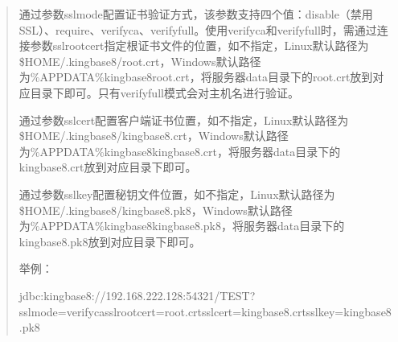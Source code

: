 \documentclass[letterpaper,10pt,english]{sphinxmanual}
\begin{document}
\begin{quote}

通过参数sslmode配置证书验证方式，该参数支持四个值：disable（禁用SSL）、require、verify\sphinxhyphen{}ca、verify\sphinxhyphen{}full。使用verify\sphinxhyphen{}ca和verify\sphinxhyphen{}full时，需通过连接参数sslrootcert指定根证书文件的位置，如不指定，Linux默认路径为\$HOME/.kingbase8/root.crt，Windows默认路径为\%APPDATA\%kingbase8root.crt，将服务器data目录下的root.crt放到对应目录下即可。只有verify\sphinxhyphen{}full模式会对主机名进行验证。

通过参数sslcert配置客户端证书位置，如不指定，Linux默认路径为\$HOME/.kingbase8/kingbase8.crt，Windows默认路径为\%APPDATA\%kingbase8kingbase8.crt，将服务器data目录下的kingbase8.crt放到对应目录下即可。

通过参数sslkey配置秘钥文件位置，如不指定，Linux默认路径为\$HOME/.kingbase8/kingbase8.pk8，Windows默认路径为\%APPDATA\%kingbase8kingbase8.pk8，将服务器data目录下的kingbase8.pk8放到对应目录下即可。

举例：

\begin{sphinxVerbatim}[commandchars=\\\{\}]
jdbc:kingbase8://192.168.222.128:54321/TEST?sslmode=verify\PYGZhy{}ca\PYGZam{}sslrootcert=root.crt\PYGZam{}sslcert=kingbase8.crt\PYGZam{}sslkey=kingbase8.pk8
\end{sphinxVerbatim}
\end{quote}

\end{document}
